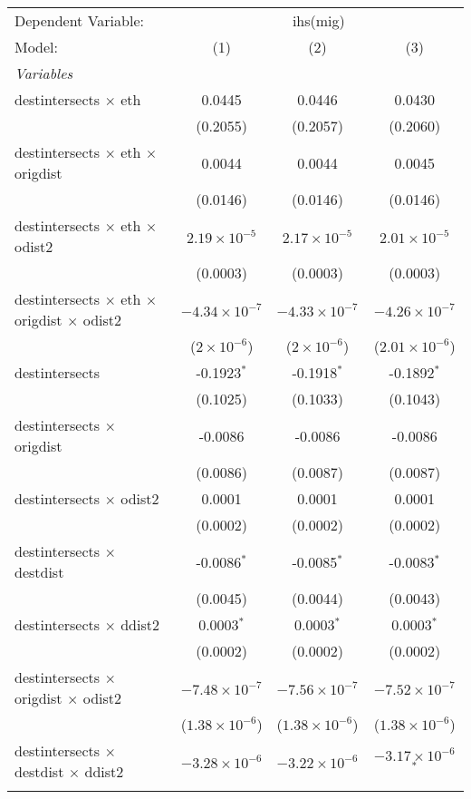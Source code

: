 \begin{tabular}{lccc}
\tabularnewline\midrule\midrule
Dependent Variable:&\multicolumn{3}{c}{ihs(mig)}\\
Model:&(1) & (2) & (3)\\
\midrule \emph{Variables}&   &   &  \\
destintersects $\times $ eth & 0.0445 & 0.0446 & 0.0430\\
  &(0.2055) & (0.2057) & (0.2060)\\
destintersects $\times $ eth $\times $ origdist & 0.0044 & 0.0044 & 0.0045\\
  &(0.0146) & (0.0146) & (0.0146)\\
destintersects $\times $ eth $\times $ odist2 & $2.19\times 10^{-5}$ & $2.17\times 10^{-5}$ & $2.01\times 10^{-5}$\\
  &(0.0003) & (0.0003) & (0.0003)\\
destintersects $\times $ eth $\times $ origdist $\times $ odist2 & $-4.34\times 10^{-7}$ & $-4.33\times 10^{-7}$ & $-4.26\times 10^{-7}$\\
  &($2\times 10^{-6}$) & ($2\times 10^{-6}$) & ($2.01\times 10^{-6}$)\\
destintersects & -0.1923$^{*}$ & -0.1918$^{*}$ & -0.1892$^{*}$\\
  &(0.1025) & (0.1033) & (0.1043)\\
destintersects $\times $ origdist & -0.0086 & -0.0086 & -0.0086\\
  &(0.0086) & (0.0087) & (0.0087)\\
destintersects $\times $ odist2 & 0.0001 & 0.0001 & 0.0001\\
  &(0.0002) & (0.0002) & (0.0002)\\
destintersects $\times $ destdist & -0.0086$^{*}$ & -0.0085$^{*}$ & -0.0083$^{*}$\\
  &(0.0045) & (0.0044) & (0.0043)\\
destintersects $\times $ ddist2 & 0.0003$^{*}$ & 0.0003$^{*}$ & 0.0003$^{*}$\\
  &(0.0002) & (0.0002) & (0.0002)\\
destintersects $\times $ origdist $\times $ odist2 & $-7.48\times 10^{-7}$ & $-7.56\times 10^{-7}$ & $-7.52\times 10^{-7}$\\
  &($1.38\times 10^{-6}$) & ($1.38\times 10^{-6}$) & ($1.38\times 10^{-6}$)\\
destintersects $\times $ destdist $\times $ ddist2 & $-3.28\times 10^{-6}$ & $-3.22\times 10^{-6}$ & $-3.17\times 10^{-6}$$^{*}$\\
$$
\end{tabular}

